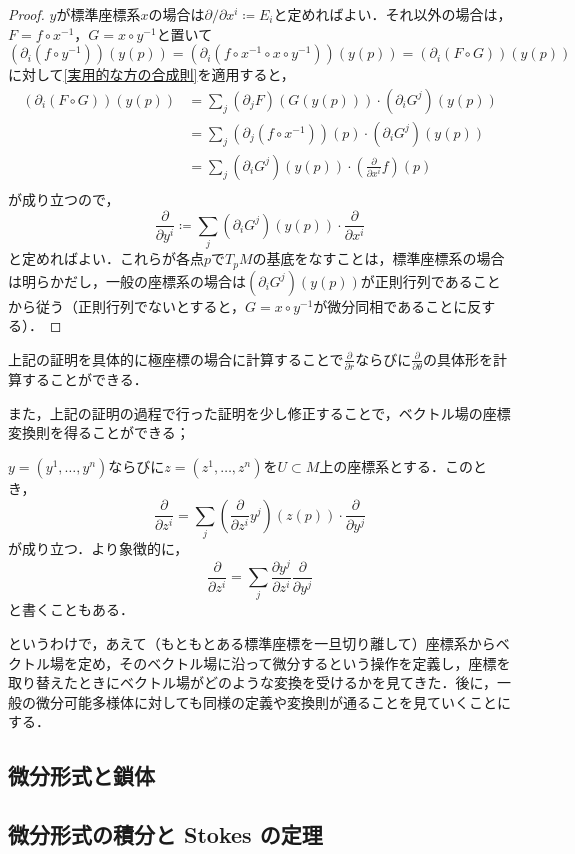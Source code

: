 \begin{proof}
$y$が標準座標系$x$の場合は$\partial / \partial x^i \coloneqq E_i$と定めればよい．それ以外の場合は，$F = f \circ x^{-1}$，$G = x \circ y^{-1}$と置いて$\left(\partial_i (f \circ y^{-1}) \right) (y (p)) = \left(\partial_i (f \circ x^{-1} \circ x \circ y^{-1}) \right) (y (p)) = \left(\partial_i (F \circ G) \right) (y (p))$に対して\cref{実用的な方の合成則}を適用すると，
\begin{align}
\left(\partial_i (F \circ G) \right) (y (p)) &= \sum_{j} (\partial_j F)(G(y(p))) \cdot (\partial_i G^j)(y(p))\\
&= \sum_{j} (\partial_j (f \circ x^{-1}))(p) \cdot (\partial_i G^j)(y(p))\\
&= \sum_{j} (\partial_i G^j)(y(p)) \cdot \left(\frac{\partial}{\partial x^i} f\right)(p)\\
\end{align}が成り立つので，
\begin{equation}
\frac{\partial}{\partial y^i} \coloneqq \sum_{j} (\partial_i G^j)(y(p)) \cdot \frac{\partial}{\partial x^i}
\end{equation}と定めればよい．これらが各点$p$で$T_pM$の基底をなすことは，標準座標系の場合は明らかだし，一般の座標系の場合は$(\partial_i G^j)(y(p))$が正則行列であることから従う（正則行列でないとすると，$G = x \circ y^{-1}$が微分同相であることに反する）．
\end{proof}

\begin{que}
上記の証明を具体的に極座標の場合に計算することで$\frac{\partial}{\partial r}$ならびに$\frac{\partial}{\partial \theta}$の具体形を計算することができる．
\end{que}

また，上記の証明の過程で行った証明を少し修正することで，ベクトル場の座標変換則を得ることができる；

\begin{prop}
$y=(y^1, \dots, y^n)$ならびに$z = (z^1,\dots, z^n)$を$U \subset M$上の座標系とする．このとき，
\begin{equation}
\frac{\partial}{\partial z^i} = \sum_{j} \left( \frac{\partial }{\partial z^i} y^j \right) (z(p)) \cdot \frac{\partial}{\partial y^j}
\end{equation}が成り立つ．より象徴的に，
\begin{equation}
\frac{\partial}{\partial z^i} = \sum_{j} \frac{\partial y^j}{\partial z^i} \frac{\partial}{\partial y^j}
\end{equation}と書くこともある．
\end{prop}

というわけで，あえて（もともとある標準座標を一旦切り離して）座標系からベクトル場を定め，そのベクトル場に沿って微分するという操作を定義し，座標を取り替えたときにベクトル場がどのような変換を受けるかを見てきた．後に，一般の微分可能多様体に対しても同様の定義や変換則が通ることを見ていくことにする．

\subsection{微分形式と鎖体}

\subsection{微分形式の積分と Stokes の定理}